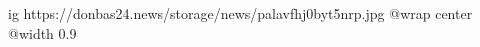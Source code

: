  
 
 
 
 

\ifcmt
  ig https://donbas24.news/storage/news/palavfhj0byt5nrp.jpg
  @wrap center
  @width 0.9
\fi
